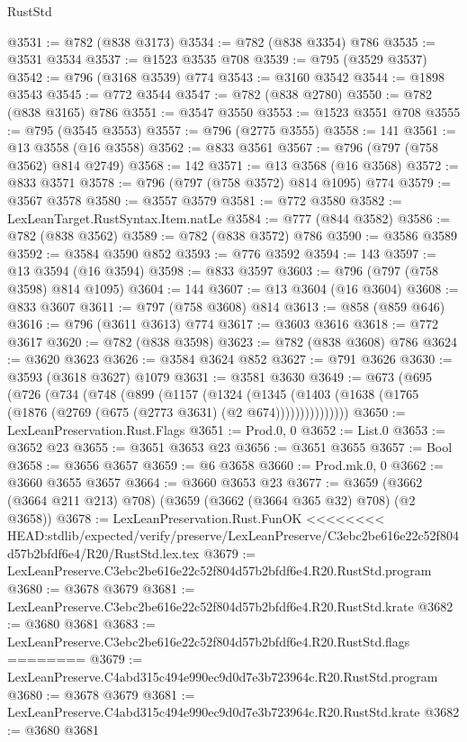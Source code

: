 \begin{lexlean}{RustStd}
\begin{coremodule}
{\begin{coremodule}
{{{{{{{{{{{{{{@3531 := @782 (@838 @3173)
@3534 := @782 (@838 @3354) @786
@3535 := @3531 @3534
@3537 := @1523 @3535 @708
@3539 := @795 (@3529 @3537)
@3542 := @796 (@3168 @3539) @774
@3543 := @3160 @3542
@3544 := @1898 @3543
@3545 := @772 @3544
@3547 := @782 (@838 @2780)
@3550 := @782 (@838 @3165) @786
@3551 := @3547 @3550
@3553 := @1523 @3551 @708
@3555 := @795 (@3545 @3553)
@3557 := @796 (@2775 @3555)
@3558 := 141
@3561 := @13 @3558 (@16 @3558)
@3562 := @833 @3561
@3567 := @796 (@797 (@758 @3562) @814 @2749)
@3568 := 142
@3571 := @13 @3568 (@16 @3568)
@3572 := @833 @3571
@3578 := @796 (@797 (@758 @3572) @814 @1095) @774
@3579 := @3567 @3578
@3580 := @3557 @3579
@3581 := @772 @3580
@3582 := LexLeanTarget.RustSyntax.Item.natLe
@3584 := @777 (@844 @3582)
@3586 := @782 (@838 @3562)
@3589 := @782 (@838 @3572) @786
@3590 := @3586 @3589
@3592 := @3584 @3590 @852
@3593 := @776 @3592
@3594 := 143
@3597 := @13 @3594 (@16 @3594)
@3598 := @833 @3597
@3603 := @796 (@797 (@758 @3598) @814 @1095)
@3604 := 144
@3607 := @13 @3604 (@16 @3604)
@3608 := @833 @3607
@3611 := @797 (@758 @3608) @814
@3613 := @858 (@859 @646)
@3616 := @796 (@3611 @3613) @774
@3617 := @3603 @3616
@3618 := @772 @3617
@3620 := @782 (@838 @3598)
@3623 := @782 (@838 @3608) @786
@3624 := @3620 @3623
@3626 := @3584 @3624 @852
@3627 := @791 @3626
@3630 := @3593 (@3618 @3627) @1079
@3631 := @3581 @3630
@3649 := @673
    (@695
      (@726
        (@734
          (@748
            (@899
              (@1157
                (@1324
                  (@1345
                    (@1403 (@1638 (@1765 (@1876 (@2769 (@675 (@2773 @3631) (@2 @674)))))))))))))))
@3650 := LexLeanPreservation.Rust.Flags
@3651 := Prod.{0, 0}
@3652 := List.{0}
@3653 := @3652 @23
@3655 := @3651 @3653 @23
@3656 := @3651 @3655
@3657 := Bool
@3658 := @3656 @3657
@3659 := @6 @3658
@3660 := Prod.mk.{0, 0}
@3662 := @3660 @3655 @3657
@3664 := @3660 @3653 @23
@3677 := @3659 (@3662 (@3664 @211 @213) @708) (@3659 (@3662 (@3664 @365 @32) @708) (@2 @3658))
@3678 := LexLeanPreservation.Rust.FunOK
<<<<<<<< HEAD:stdlib/expected/verify/preserve/LexLeanPreserve/C3ebc2be616e22c52f804d57b2bfdf6e4/R20/RustStd.lex.tex
@3679 := LexLeanPreserve.C3ebc2be616e22c52f804d57b2bfdf6e4.R20.RustStd.program
@3680 := @3678 @3679
@3681 := LexLeanPreserve.C3ebc2be616e22c52f804d57b2bfdf6e4.R20.RustStd.krate
@3682 := @3680 @3681
@3683 := LexLeanPreserve.C3ebc2be616e22c52f804d57b2bfdf6e4.R20.RustStd.flags
========
@3679 := LexLeanPreserve.C4abd315c494e990ec9d0d7e3b723964c.R20.RustStd.program
@3680 := @3678 @3679
@3681 := LexLeanPreserve.C4abd315c494e990ec9d0d7e3b723964c.R20.RustStd.krate
@3682 := @3680 @3681
}}}}}}}}}}}}}}
\end{coremodule}}
\end{coremodule}
\end{lexlean}
